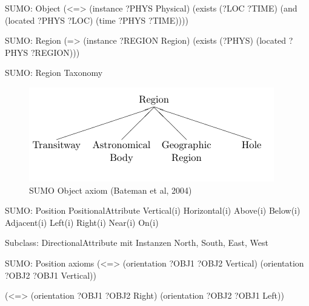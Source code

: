 \documentclass[12pt,a4paper]{beamer}
\begin{document}
\begin{frame}{SUMO: Object}
(<=> (instance ?PHYS Physical)
(exists (?LOC ?TIME)
(and
(located ?PHYS ?LOC)
(time ?PHYS ?TIME))))
\end{frame}




\begin{frame}{SUMO: Region}
(=>
(instance ?REGION Region)
(exists (?PHYS)
(located ?PHYS ?REGION)))
\end{frame}



\begin{frame}{SUMO: Region Taxonomy}
\begin{figure}
\includegraphics[scale=0.45]{img/d2_region_taxonomy.png}
\caption{SUMO Object axiom (Bateman et al, 2004)}
\end{figure}
\end{frame}

\begin{frame}{SUMO: Position}
PositionalAttribute
Vertical(i)
Horizontal(i)
Above(i)
Below(i)
Adjacent(i)
Left(i)
Right(i)
Near(i)
On(i)

Subclass: DirectionalAttribute mit Instanzen North, South, East, West
\end{frame}

\begin{frame}{SUMO: Position axioms}
(<=> (orientation ?OBJ1 ?OBJ2 Vertical)
(orientation ?OBJ2 ?OBJ1 Vertical))


(<=>
 (orientation ?OBJ1 ?OBJ2 Right)
(orientation ?OBJ2 ?OBJ1 Left))
\end{frame}
\end{document}

